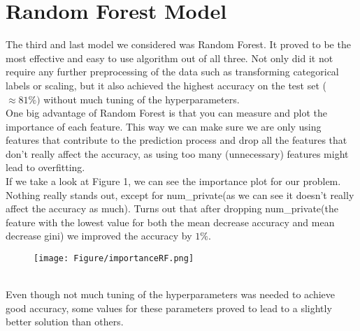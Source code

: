 \section{Random Forest Model} \label{randForest}
The third and last model we considered was Random Forest. It proved to be the most effective and easy to use algorithm out of all three. Not only did it not require any further preprocessing of the data such as transforming categorical labels or scaling, but it also achieved the highest accuracy on the test set ($\approx 81\%)$ without much tuning of the hyperparameters. \\
One big advantage of Random Forest is that you can measure and plot the importance of each feature. This way we can make sure we are only using features that contribute to the prediction process and drop all the features that don't really affect the accuracy, as using too many (unnecessary) features might lead to overfitting.\\
If we take a look at Figure 1, we can see the importance plot for our problem. Nothing really stands out, except for num\_private(as we can see it doesn't really affect the accuracy as much). Turns out that after dropping num\_private(the feature with the lowest value for both the mean decrease accuracy and mean decrease gini) we improved the accuracy by $1\%$.
\begin{figure}[h]
\texttt{[image: Figure/importanceRF.png]}
\centering
\end{figure}\\
Even though not much tuning of the hyperparameters was needed to achieve good accuracy, some values for these parameters proved to lead to a slightly better solution than others.
